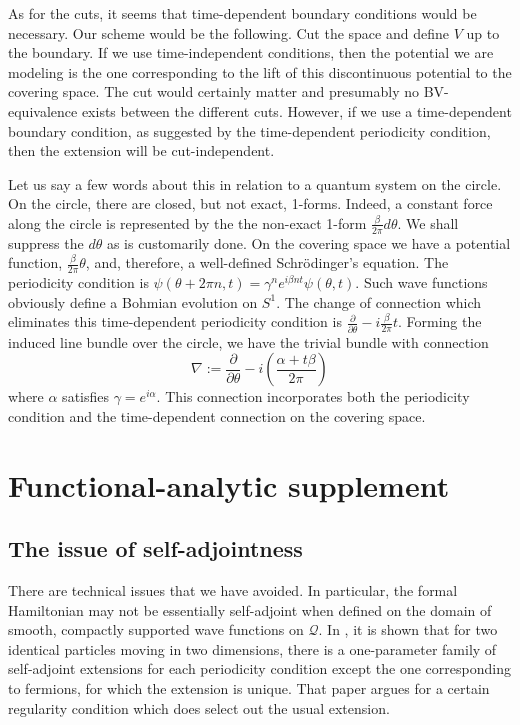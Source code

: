 \documentclass[11pt]{article}
\theoremstyle{remark}
\begin{document}
As for the cuts, it seems that time-dependent boundary conditions
would be necessary. Our scheme would be the following. Cut the space
and define $V$ up to the boundary.
If we use time-independent conditions,
then the potential we are modeling is the one corresponding to the
lift of this discontinuous potential to the covering space. The cut
would certainly matter and  presumably no 
BV-equivalence exists between the different cuts. 
However, if we use a time-dependent
boundary condition, as suggested by the time-dependent periodicity condition,
then the extension will be cut-independent.


Let us say a few words about this in relation to a quantum system on
the circle. 
On the circle, there are closed, but not
exact, 1-forms. 
Indeed, a constant force along
the circle is represented by the the non-exact 1-form
$\frac{\beta}{2\pi}d\theta $. We shall suppress the $d\theta$ as is
customarily done.   
On the covering space we
have a potential function, $\frac{\beta}{2\pi} \theta$,  and, therefore, a
well-defined Schr\"odinger's equation.  The
  periodicity condition is $\ensuremath{\psi} (\theta +2\pi n, t) = \gamma^n e^{i
\beta n t} \ensuremath{\psi}(\theta, t)$. 
Such wave functions obviously define a Bohmian evolution on $S^1$.
The change of connection which eliminates this time-dependent
periodicity condition is $\ensuremath{\frac{\partial {}}{\partial {\theta}}} - i \frac{\beta}{2 \pi}
t$. Forming the induced line bundle over the circle, we have the
trivial bundle with 
 connection 
\begin{equation*} 
\nabla \ensuremath{:=} \ensuremath{\frac{\partial {}}{\partial {\theta}}} - i ( \frac{\alpha + t \beta}{2 \pi} )
\end{equation*}
 where $\alpha$
satisfies $\gamma = e^{i \alpha}$. This connection incorporates both the
periodicity condition and the time-dependent connection on the
covering space.

\clearpage

\section{Functional-analytic supplement}

\subsection{The issue of self-adjointness} \label{s:sat} \label{a:functan}

There are technical issues that we have avoided. In particular,
 the formal Hamiltonian may not be essentially self-adjoint when
defined on the domain of smooth, compactly supported wave functions on
\ensuremath{\mathcal{Q}}. 
In \cite{BS92}, it is
shown that for two identical particles moving in two dimensions, there
is a one-parameter 
family of self-adjoint extensions for each periodicity condition
except the one corresponding to fermions, for which the extension is
unique. That paper argues for a
certain regularity condition which does select out the usual
extension. 
\end{document}

